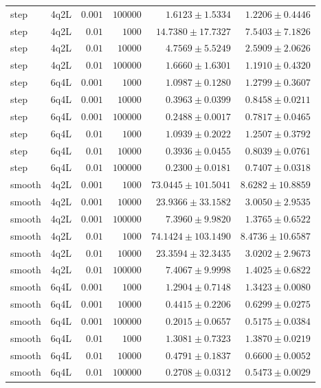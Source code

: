 \documentclass[11pt]{article}
\begin{document}
\begin{longtable}{llrrrr}
step & 4q2L & $0.001$ & $100000$ & $1.6123\pm1.5334$ & $1.2206\pm0.4446$ \\
step & 4q2L & $0.01$ & $1000$ & $14.7380\pm17.7327$ & $7.5403\pm7.1826$ \\
step & 4q2L & $0.01$ & $10000$ & $4.7569\pm5.5249$ & $2.5909\pm2.0626$ \\
step & 4q2L & $0.01$ & $100000$ & $1.6660\pm1.6301$ & $1.1910\pm0.4320$ \\
\midrule
step & 6q4L & $0.001$ & $1000$ & $1.0987\pm0.1280$ & $1.2799\pm0.3607$ \\
step & 6q4L & $0.001$ & $10000$ & $0.3963\pm0.0399$ & $0.8458\pm0.0211$ \\
step & 6q4L & $0.001$ & $100000$ & $0.2488\pm0.0017$ & $0.7817\pm0.0465$ \\
step & 6q4L & $0.01$ & $1000$ & $1.0939\pm0.2022$ & $1.2507\pm0.3792$ \\
step & 6q4L & $0.01$ & $10000$ & $0.3936\pm0.0455$ & $0.8039\pm0.0761$ \\
step & 6q4L & $0.01$ & $100000$ & $0.2300\pm0.0181$ & $0.7407\pm0.0318$ \\
\midrule
smooth & 4q2L & $0.001$ & $1000$ & $73.0445\pm101.5041$ & $8.6282\pm10.8859$ \\
smooth & 4q2L & $0.001$ & $10000$ & $23.9366\pm33.1582$ & $3.0050\pm2.9535$ \\
smooth & 4q2L & $0.001$ & $100000$ & $7.3960\pm9.9820$ & $1.3765\pm0.6522$ \\
smooth & 4q2L & $0.01$ & $1000$ & $74.1424\pm103.1490$ & $8.4736\pm10.6587$ \\
smooth & 4q2L & $0.01$ & $10000$ & $23.3594\pm32.3435$ & $3.0202\pm2.9673$ \\
smooth & 4q2L & $0.01$ & $100000$ & $7.4067\pm9.9998$ & $1.4025\pm0.6822$ \\
\midrule
smooth & 6q4L & $0.001$ & $1000$ & $1.2904\pm0.7148$ & $1.3423\pm0.0080$ \\
smooth & 6q4L & $0.001$ & $10000$ & $0.4415\pm0.2206$ & $0.6299\pm0.0275$ \\
smooth & 6q4L & $0.001$ & $100000$ & $0.2015\pm0.0657$ & $0.5175\pm0.0384$ \\
smooth & 6q4L & $0.01$ & $1000$ & $1.3081\pm0.7323$ & $1.3870\pm0.0219$ \\
smooth & 6q4L & $0.01$ & $10000$ & $0.4791\pm0.1837$ & $0.6600\pm0.0052$ \\
smooth & 6q4L & $0.01$ & $100000$ & $0.2708\pm0.0312$ & $0.5473\pm0.0029$ \\
\end{longtable}
\endgroup
\end{document}
